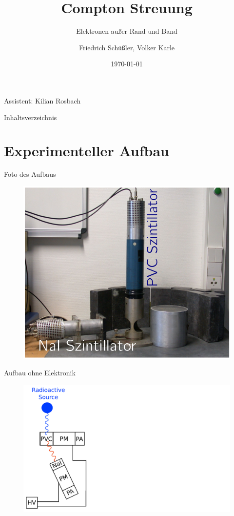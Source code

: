 \documentclass[xcolor=x11names,compress]{beamer}
\renewcommand{\(}{\begin{columns}}
\renewcommand{\)}{\end{columns}}
\newcommand{\<}[1]{\begin{column}{#1}}
\renewcommand{\>}{\end{column}}
\begin{document}
\begin{frame}{}
\title[Compton]{Compton Streuung}
\subtitle{Elektronen außer Rand und Band}
\author{
Friedrich Schüßler, Volker Karle}
\date{\today}
\titlepage

\centering 
Assistent: Kilian Rosbach
\end{frame}

\begin{frame}{Inhaltsverzeichnis}
\tableofcontents
\end{frame}



\section{Experimenteller Aufbau}
\begin{frame}[t]{Foto des Aufbaus}
\begin{figure}[htpb]
    \centering
    \includegraphics[width=0.7\linewidth]{../figures/photographie1}
\label{fig:foto}
\end{figure}
\end{frame}

\begin{frame}[t]{Aufbau ohne Elektronik}
\begin{figure}[htpb]
    \centering
    \includegraphics[width=1.0\linewidth]{../figures/setup_pres_pre}
\label{fig:setup_pre}
\end{figure}
\end{frame}
\end{document}
